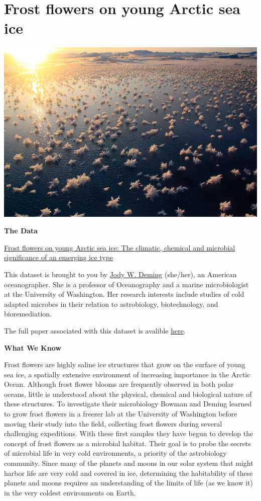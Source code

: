 \documentclass[]{book}
\begin{document}
\hypertarget{section}{%
\section*{Frost flowers on young Arctic sea ice}\label{section}}

\includegraphics{images/frostflowers.jpg}

\textbf{The Data}

\href{https://arcticdata.io/catalog/view/doi\%3A10.18739\%2FA2N036}{Frost flowers on young Arctic sea ice: The climatic, chemical and microbial significance of an emerging ice type}

This dataset is brought to you by \href{https://www.ocean.washington.edu/story/Jody_Deming_Ecosystem}{Jody W. Deming} (she/her), an American oceanographer. She is a professor of Oceanography and a marine microbiologist at the University of Washington. Her research interests include studies of cold adapted microbes in their relation to astrobiology, biotechnology, and bioremediation.

The full paper associated with this dataset is avalible \href{https://agupubs.onlinelibrary.wiley.com/doi/full/10.1002/2014JD021736}{here}.

\textbf{What We Know}

Frost flowers are highly saline ice structures that grow on the surface of young sea ice, a spatially extensive environment of increasing importance in the Arctic Ocean. Although frost flower blooms are frequently observed in both polar oceans, little is understood about the physical, chemical and biological nature of these structures. To investigate their microbiology Bowman and Deming learned to grow frost flowers in a freezer lab at the University of Washington before moving their study into the field, collecting frost flowers during several challenging expeditions. With these first samples they have begun to develop the concept of frost flowers as a microbial habitat. Their goal is to probe the secrets of microbial life in very cold environments, a priority of the astrobiology community. Since many of the planets and moons in our solar system that might harbor life are very cold and covered in ice, determining the habitability of these planets and moons requires an understanding of the limits of life (as we know it) in the very coldest environments on Earth.
\end{document}

